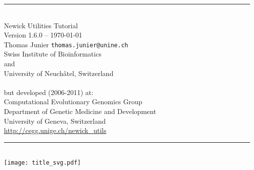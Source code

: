 \documentclass[a4paper,10pt]{report}
\newcommand{\Hrule}[1]{\rule{\linewidth}{#1}}
\begin{document}
\nobibliography*

\begin{titlepage}
\begin{center}
\Hrule{0.5mm} \\[0.8cm]
{\Huge Newick Utilities Tutorial} \\[0.5cm]
Version 1.6.0 -- \today \\
\medskip
Thomas Junier \texttt{thomas.junier@unine.ch} \\
Swiss Institute of Bioinformatics \\
and \\
University of Neuch\^{a}tel, Switzerland \\
   \\
but developed (2006-2011) at: \\
Computational Evolutionary Genomics Group \\
Department of Genetic Medicine and Development \\
University of Geneva, Switzerland \\
\medskip
\url{http://cegg.unige.ch/newick_utils}
\Hrule{0.5mm}
\\[2cm]
\texttt{[image: title\_svg.pdf]}
\end{center}
\end{titlepage}

\tableofcontents











\appendix












% 

% 
\end{document}
